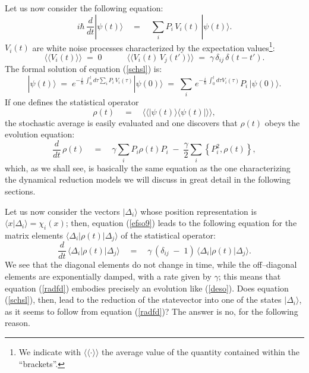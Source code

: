 \documentclass[12pt]{article}
\newcommand{\llangle}{\langle\!\langle}
\newcommand{\rrangle}{\rangle\!\rangle}
\begin{document}
Let us now consider the following equation:
\begin{equation} \label{schsl}
i\hbar\,\frac{d}{dt}|\psi(t)\rangle \quad = \quad \sum_{i} P_{i}
\, V_{i}(t)\, |\psi(t)\rangle.
\end{equation}
$V_{i}(t)$ are white noise processes characterized by the
expectation values\footnote{We indicate with $\llangle \cdot
\rrangle$ the average value of the quantity contained within the
``brackets''.}:
\begin{equation}
\llangle V_{i}(t) \rrangle \; = \; 0 \qquad\quad \llangle
V_{i}(t)\, V_{j}(t') \rrangle \; = \;
\gamma\,\delta_{ij}\,\delta(t-t').
\end{equation}
The formal solution of equation (\ref{schsl}) is:
\begin{equation}
|\psi(t)\rangle \; = \; e^{\displaystyle -\frac{i}{\hbar}\,
\int_{0}^{t} d\tau \sum_{i} P_{i}\, V_{i}(\tau)} |\psi(0)\rangle
\; = \; \sum_{i}\, e^{\displaystyle -\frac{i}{\hbar}\,
\int_{0}^{t} d\tau V_{i}(\tau)} P_{i}\, |\psi(0)\rangle.
\end{equation}
If one defines the statistical operator
\begin{equation} \label{sjsfhj}
\rho(t) \quad = \quad \llangle |\psi(t)\rangle\langle \psi(t)|
\rrangle,
\end{equation}
the stochastic average is easily evaluated and one discovers that
$\rho(t)$ obeys the evolution equation:
\begin{equation} \label{efso9}
\frac{d}{dt}\, \rho(t) \quad = \quad \gamma \sum_{i} P_{i} \rho(t)
P_{i} \; - \; \frac{\gamma}{2} \sum_{i} \left\{ P^{2}_{i}, \rho(t)
\right\},
\end{equation}
which, as we shall see, is basically the same equation as the one
characterizing the dynamical reduction models we will discuss in
great detail in the following sections.

Let us now consider the vectors $|\Delta_{i}\rangle$ whose
position representation is $\langle x |\Delta_{i}\rangle =
\chi_{i}(x)$; then, equation (\ref{efso9}) leads to the following
equation for the matrix elements
$\langle\Delta_{i}|\rho(t)|\Delta_{j}\rangle$ of the statistical
operator:
\begin{equation} \label{radfd}
\frac{d}{dt}\, \langle\Delta_{i}|\rho(t)|\Delta_{j}\rangle \quad =
\quad \gamma\,(\delta_{ij} \; - \; 1)\,
\langle\Delta_{i}|\rho(t)|\Delta_{j}\rangle.
\end{equation}
We see that the diagonal elements do not change in time, while the
off--diagonal elements are exponentially damped, with a rate given
by $\gamma$; this means that equation (\ref{radfd}) embodies
precisely an evolution like (\ref{deso}). Does equation
(\ref{schsl}), then,  lead to the reduction of the statevector
into one of the states $|\Delta_{i}\rangle$, as it seems to follow
from equation (\ref{radfd})? The answer is no, for the following
reason.
\end{document}
